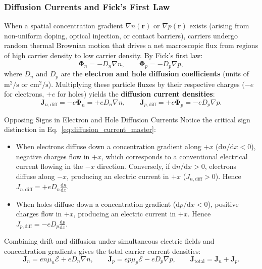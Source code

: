 \documentclass[11pt,a4paper]{article}
\newcommand{\vb}[1]{\mathbf{#1}}
\newcommand{\dd}{\mathrm{d}}
\newcommand{\rvec}{\mathbf{r}}
\begin{document}
\subsubsection{Diffusion Currents and Fick's First Law}
When a spatial concentration gradient $\nabla n(\rvec)$ or $\nabla p(\rvec)$ exists (arising from non-uniform doping, optical injection, or contact barriers), carriers undergo random thermal Brownian motion that drives a net macroscopic flux from regions of high carrier density to low carrier density. By Fick's first law:
\begin{equation}
    \bm{\Phi}_n = -D_n \nabla n, \qquad \bm{\Phi}_p = -D_p \nabla p,
\end{equation}
where $D_n$ and $D_p$ are the \textbf{electron and hole diffusion coefficients} (units of $\mathrm{m^2/s}$ or $\mathrm{cm^2/s}$). Multiplying these particle fluxes by their respective charges ($-e$ for electrons, $+e$ for holes) yields the \textbf{diffusion current densities}:
\begin{equation}
    \boxed{\vb{J}_{n,\mathrm{diff}} = -e\bm{\Phi}_n = +e D_n \nabla n, \qquad \vb{J}_{p,\mathrm{diff}} = +e\bm{\Phi}_p = -e D_p \nabla p.}
    \label{eq:diffusion_current_master}
\end{equation}
\begin{pitfallbox}{Opposing Signs in Electron and Hole Diffusion Currents}
Notice the critical sign distinction in Eq.~\eqref{eq:diffusion_current_master}:
\begin{itemize}[noitemsep]
    \item When electrons diffuse down a concentration gradient along $+x$ ($\dd n/\dd x < 0$), negative charges flow in $+x$, which corresponds to a conventional electrical current flowing in the $-x$ direction. Conversely, if $\dd n/\dd x > 0$, electrons diffuse along $-x$, producing an electric current in $+x$ ($J_{n,\mathrm{diff}} > 0$). Hence $J_{n,\mathrm{diff}} = +e D_n \frac{\dd n}{\dd x}$.
    \item When holes diffuse down a concentration gradient ($\dd p/\dd x < 0$), positive charges flow in $+x$, producing an electric current in $+x$. Hence $J_{p,\mathrm{diff}} = -e D_p \frac{\dd p}{\dd x}$.
\end{itemize}
\end{pitfallbox}

Combining drift and diffusion under simultaneous electric fields and concentration gradients gives the total carrier current densities:
\begin{equation}
    \boxed{\vb{J}_n = e n \mu_n \bm{\mathcal{E}} + e D_n \nabla n, \qquad \vb{J}_p = e p \mu_p \bm{\mathcal{E}} - e D_p \nabla p, \qquad \vb{J}_{\mathrm{total}} = \vb{J}_n + \vb{J}_p.}
    \label{eq:total_current_master}
\end{equation}
\end{document}
